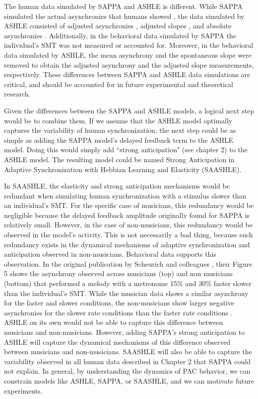 \documentclass{report}
\begin{document}
The human data simulated by SAPPA and ASHLE is different. While SAPPA simulated the actual asynchronies that humans showed \cite{roman2019delayed}, the data simulated by ASHLE consisted of adjusted asynchronies \cite{scheurich2018tapping}, adjusted slopes \cite{zamm2018musicians}, and absolute asynchronies \cite{zamm2016endogenous}. Additionally, in the behavioral data simulated by SAPPA the individual's SMT was not measured or accounted for. Moreover, in the behavioral data simulated by ASHLE, the mean asynchrony and the spontaneous slope were removed to obtain the adjusted asynchrony and the adjusted slope measurements, respectively. These differences between SAPPA and ASHLE data simulations are critical, and should be accounted for in future experimental and theoretical research. 

Given the differences between the SAPPA and ASHLE models, a logical next step would be to combine them. If we assume that the ASHLE model optimally captures the variability of human synchronization, the next step could be as simple as adding the SAPPA model's delayed feedback term to the ASHLE model. Doing this would simply add ``strong anticipation" (see chapter 2) to the ASHLE model. The resulting model could be named Strong Anticipation in Adaptive Synchronization with Hebbian Learning and Elasticity (SAASHLE). 

In SAASHLE, the elasticity and strong anticipation mechanisms would be redundant when simulating human synchronization with a stimulus slower than an individual's SMT. For the specific case of musicians, this redundancy would be negligible because the delayed feedback amplitude originally found for SAPPA is relatively small. However, in the case of non-musicians, this redundancy would be observed in the model's activity. This is not necessarily a bad thing, because such redundancy exists in the dynamical mechanisms of adaptive synchronization and anticipation observed in non-musicians. Behavioral data supports this observation. In the original publication by Scheurich and colleagues \cite{scheurich2018tapping}, their Figure 5 shows the asynchrony observed across musicians (top) and non musicians (bottom) that performed a melody with a metronome 15\% and 30\% faster slower than the individual's SMT. While the musician data shows a similar asynchrony for the faster and slower conditions, the non-musicians show larger negative asynchronies for the slower rate conditions than the faster rate conditions \cite{scheurich2018tapping}. ASHLE on its own would not be able to capture this difference between musicians and non-musicians. However, adding SAPPA's strong anticipation to ASHLE will capture the dynamical mechanisms of this difference observed between musicians and non-musicians. SAASHLE will also be able to capture the variability observed in all human data described in Chapter 2 that SAPPA could not explain. In general, by understanding the dynamics of PAC behavior, we can constrain models like ASHLE, SAPPA, or SAASHLE, and we can motivate future experiments. 
\end{document}
